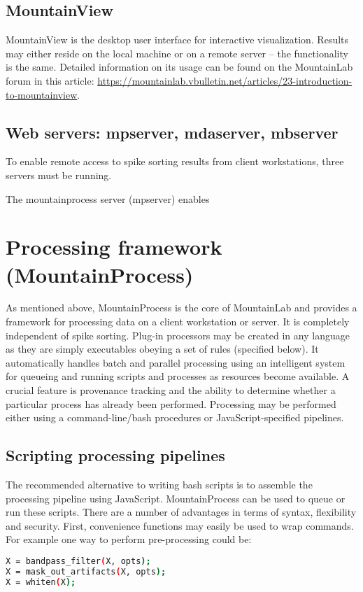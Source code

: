 \documentclass{article}
\begin{document}
\subsection{MountainView}

MountainView is the desktop user interface for interactive visualization. Results may either reside on the local machine or on a remote server -- the functionality is the same. Detailed information on its usage can be found on the MountainLab forum in this article: \url{https://mountainlab.vbulletin.net/articles/23-introduction-to-mountainview}.

\subsection{Web servers: mpserver, mdaserver, mbserver}

To enable remote access to spike sorting results from client workstations, three servers must be running. 

The mountainprocess server (mpserver) enables

\section{Processing framework (MountainProcess)}

As mentioned above, MountainProcess is the core of MountainLab and provides a framework for processing data on a client workstation or server. It is completely independent of spike sorting. Plug-in processors may be created in any language as they are simply executables obeying a set of rules (specified below). It automatically handles batch and parallel processing using an intelligent system for queueing and running scripts and processes as resources become available. A crucial feature is provenance tracking and the ability to determine whether a particular process has already been performed. Processing may be performed either using a command-line/bash procedures or JavaScript-specified pipelines.

\subsection{Scripting processing pipelines}

The recommended alternative to writing bash scripts is to assemble the processing pipeline using JavaScript. MountainProcess can be used to queue or run these scripts. There are a number of advantages in terms of syntax, flexibility and security. First, convenience functions may easily be used to wrap commands. For example one way to perform pre-processing could be:
\begin{lstlisting}[language=bash]
X = bandpass_filter(X, opts);
X = mask_out_artifacts(X, opts);
X = whiten(X);
\end{lstlisting}
\end{document}

